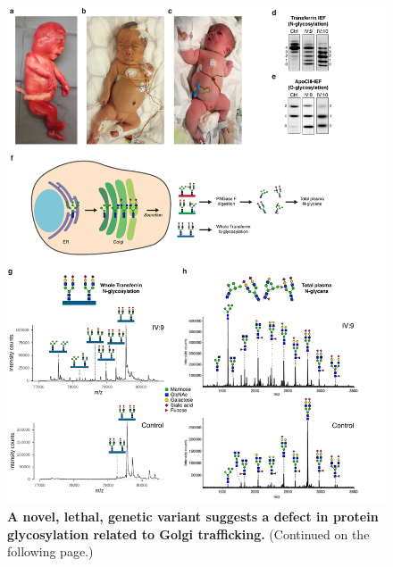 \begin{figure}
    \includegraphics[keepaspectratio=true,width=\textwidth,height=\textheight]{chapters/chapter6/chapter6_Figure1.pdf}
    \caption{\textbf{A novel, lethal, genetic variant suggests a defect in protein glycosylation related to Golgi trafficking.} (Continued on the following page.)}
    \label{fig:ch6fig1}
\end{figure}
